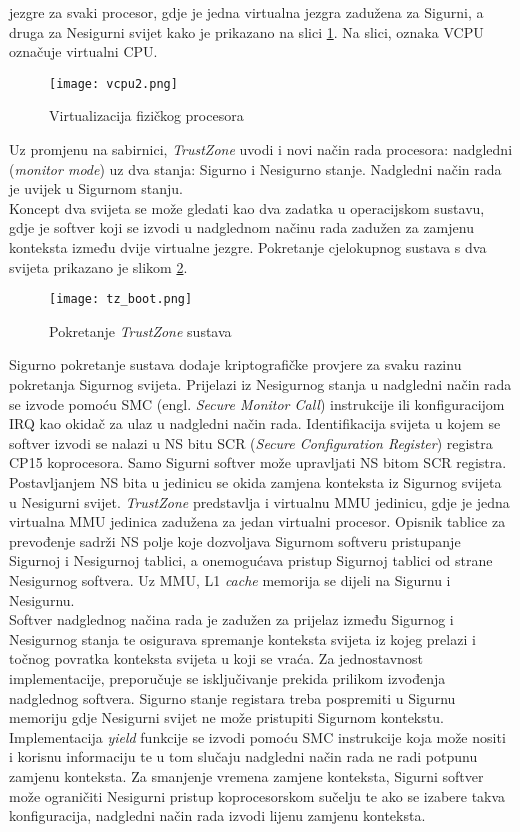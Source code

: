 \documentclass[times, utf8, diplomski, numeric]{fer}
\begin{document}
jezgre za svaki procesor, gdje je jedna virtualna jezgra zadužena za Sigurni, a druga za Nesigurni svijet kako je prikazano na
slici \ref{vcpu}. Na slici, oznaka VCPU označuje virtualni CPU.
\begin{figure}[H]
  \centering
	\texttt{[image: vcpu2.png]}%
	\caption{Virtualizacija fizičkog procesora}
	\label{vcpu}%
\end{figure}
Uz promjenu na
sabirnici, \textit{TrustZone} uvodi i novi način rada procesora: nadgledni (\textit{monitor mode}) uz dva stanja: Sigurno
i Nesigurno stanje. Nadgledni način rada je uvijek u Sigurnom stanju.\\
Koncept dva svijeta se može gledati kao dva zadatka u operacijskom sustavu, gdje je softver koji se izvodi
u nadglednom načinu rada zadužen za zamjenu konteksta između dvije virtualne jezgre. Pokretanje cjelokupnog sustava s dva
svijeta prikazano je slikom \ref{tz_boot}.
\begin{figure}[H]
  \centering
	\texttt{[image: tz\_boot.png]}%
	\caption{Pokretanje \textit{TrustZone} sustava}
	\label{tz_boot}%
\end{figure}
Sigurno pokretanje sustava dodaje kriptografičke provjere za svaku razinu pokretanja Sigurnog svijeta.
Prijelazi iz Nesigurnog stanja u nadgledni
način rada se izvode pomoću SMC (engl. \textit{Secure Monitor Call}) instrukcije ili konfiguracijom IRQ kao okidač za ulaz
u nadgledni način rada. Identifikacija svijeta u kojem se softver izvodi se nalazi u NS bitu SCR (\textit{Secure
Configuration Register}) registra CP15 koprocesora. Samo Sigurni softver može upravljati NS bitom SCR registra. Postavljanjem
NS bita u jedinicu se okida zamjena konteksta iz Sigurnog svijeta u Nesigurni svijet. \textit{TrustZone} predstavlja i
virtualnu MMU jedinicu, gdje je jedna virtualna MMU jedinica zadužena za jedan virtualni procesor. Opisnik tablice za prevođenje
sadrži NS polje koje dozvoljava Sigurnom softveru pristupanje Sigurnoj i Nesigurnoj tablici, a onemogućava pristup Sigurnoj
tablici od strane Nesigurnog softvera. Uz MMU, L1 \textit{cache} memorija se dijeli na Sigurnu i Nesigurnu.\\
Softver nadglednog načina rada je zadužen za prijelaz između Sigurnog i Nesigurnog stanja te osigurava spremanje konteksta
svijeta iz kojeg prelazi i točnog povratka konteksta svijeta u koji se vraća. Za jednostavnost implementacije, preporučuje
se isključivanje prekida prilikom izvođenja nadglednog softvera. Sigurno stanje registara treba pospremiti u Sigurnu memoriju
gdje Nesigurni svijet ne može pristupiti Sigurnom kontekstu. Implementacija \textit{yield} funkcije se izvodi pomoću SMC
instrukcije koja može nositi i korisnu informaciju te u tom slučaju nadgledni način rada ne radi potpunu zamjenu konteksta.
Za smanjenje vremena zamjene konteksta, Sigurni softver može ograničiti Nesigurni pristup koprocesorskom sučelju te ako se
izabere takva konfiguracija, nadgledni način rada izvodi lijenu zamjenu konteksta.
\end{document}
